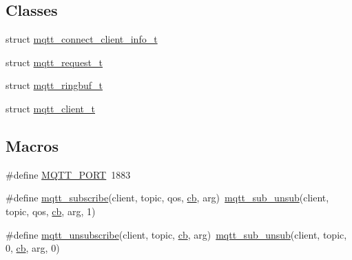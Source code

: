 \subsection*{Classes}
\begin{DoxyCompactItemize}
\item 
struct \hyperlink{structmqtt__connect__client__info__t}{mqtt\+\_\+connect\+\_\+client\+\_\+info\+\_\+t}
\item 
struct \hyperlink{structmqtt__request__t}{mqtt\+\_\+request\+\_\+t}
\item 
struct \hyperlink{structmqtt__ringbuf__t}{mqtt\+\_\+ringbuf\+\_\+t}
\item 
struct \hyperlink{structmqtt__client__t}{mqtt\+\_\+client\+\_\+t}
\end{DoxyCompactItemize}
\subsection*{Macros}
\begin{DoxyCompactItemize}
\item 
\#define \hyperlink{group__mqtt_gaa8632baff6bbb5004385998918f1e6bd}{M\+Q\+T\+T\+\_\+\+P\+O\+RT}~1883
\item 
\#define \hyperlink{group__mqtt_ga83d6a6d811b201a74d793bc1b5d4e029}{mqtt\+\_\+subscribe}(client,  topic,  qos,  \hyperlink{periph__rtt_2main_8c_afd4145001d494db2ea612e1239724148}{cb},  arg)~\hyperlink{openmote-cc2538_2lwip_2src_2include_2lwip_2apps_2mqtt_8h_afdb39d4a9758f98c02451aaa9a9b3103}{mqtt\+\_\+sub\+\_\+unsub}(client, topic, qos, \hyperlink{periph__rtt_2main_8c_afd4145001d494db2ea612e1239724148}{cb}, arg, 1)
\item 
\#define \hyperlink{group__mqtt_ga0f133ef09cbe56c46ebe2cc21afccf3f}{mqtt\+\_\+unsubscribe}(client,  topic,  \hyperlink{periph__rtt_2main_8c_afd4145001d494db2ea612e1239724148}{cb},  arg)~\hyperlink{openmote-cc2538_2lwip_2src_2include_2lwip_2apps_2mqtt_8h_afdb39d4a9758f98c02451aaa9a9b3103}{mqtt\+\_\+sub\+\_\+unsub}(client, topic, 0, \hyperlink{periph__rtt_2main_8c_afd4145001d494db2ea612e1239724148}{cb}, arg, 0)
\end{DoxyCompactItemize}
